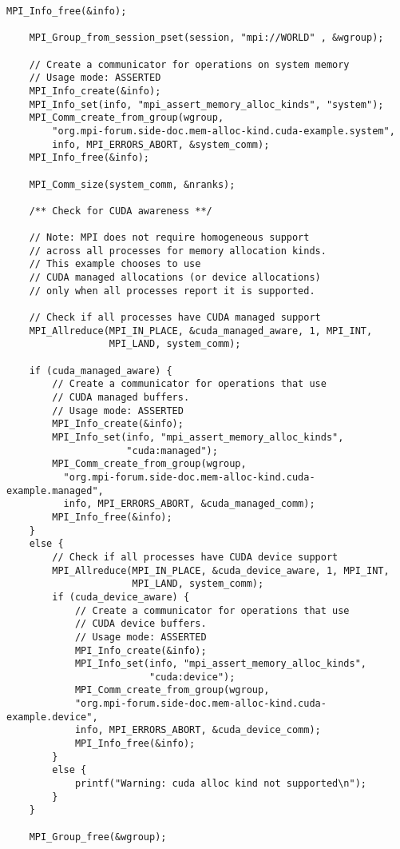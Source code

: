 \begin{example}
\begin{lstlisting}[language={[MPI]C}]
    MPI_Info_free(&info);

    MPI_Group_from_session_pset(session, "mpi://WORLD" , &wgroup);

    // Create a communicator for operations on system memory
    // Usage mode: ASSERTED
    MPI_Info_create(&info);
    MPI_Info_set(info, "mpi_assert_memory_alloc_kinds", "system");
    MPI_Comm_create_from_group(wgroup,
        "org.mpi-forum.side-doc.mem-alloc-kind.cuda-example.system",
        info, MPI_ERRORS_ABORT, &system_comm);
    MPI_Info_free(&info);

    MPI_Comm_size(system_comm, &nranks);

    /** Check for CUDA awareness **/
    
    // Note: MPI does not require homogeneous support
    // across all processes for memory allocation kinds.
    // This example chooses to use
    // CUDA managed allocations (or device allocations)
    // only when all processes report it is supported.

    // Check if all processes have CUDA managed support
    MPI_Allreduce(MPI_IN_PLACE, &cuda_managed_aware, 1, MPI_INT,
                  MPI_LAND, system_comm);

    if (cuda_managed_aware) {
        // Create a communicator for operations that use
        // CUDA managed buffers.
        // Usage mode: ASSERTED
        MPI_Info_create(&info);
        MPI_Info_set(info, "mpi_assert_memory_alloc_kinds",
                     "cuda:managed");
        MPI_Comm_create_from_group(wgroup,
          "org.mpi-forum.side-doc.mem-alloc-kind.cuda-example.managed",
          info, MPI_ERRORS_ABORT, &cuda_managed_comm);
        MPI_Info_free(&info);
    }
    else {
        // Check if all processes have CUDA device support
        MPI_Allreduce(MPI_IN_PLACE, &cuda_device_aware, 1, MPI_INT,
                      MPI_LAND, system_comm);
        if (cuda_device_aware) {
            // Create a communicator for operations that use
            // CUDA device buffers.
            // Usage mode: ASSERTED
            MPI_Info_create(&info);
            MPI_Info_set(info, "mpi_assert_memory_alloc_kinds",
                         "cuda:device");
            MPI_Comm_create_from_group(wgroup,
            "org.mpi-forum.side-doc.mem-alloc-kind.cuda-example.device",
            info, MPI_ERRORS_ABORT, &cuda_device_comm);
            MPI_Info_free(&info);
        }
        else {
            printf("Warning: cuda alloc kind not supported\n");
        }
    }

    MPI_Group_free(&wgroup);


\end{lstlisting}
\end{example}
